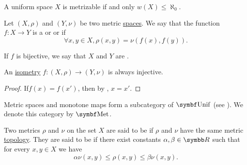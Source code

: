 \begin{theorem}\label{thm:countable_uniform_base_implies_metrizable}\cite[theorem 8.1.21]{Engelking1989}
  A uniform space \( X \) is metrizable if and only \( w(X) \leq \aleph_0 \).
\end{theorem}

\begin{definition}\label{def:isometry}\cite[253]{Engelking1989}
  Let \( (X, \rho) \) and \( (Y, \nu) \) be two metric \hyperref[def:metric_space]{spaces}. We say that the function \( f: X \to Y \) is a  or  or  if
  \begin{equation*}
    \forall x, y \in X, \rho(x, y) = \nu(f(x), f(y)).
  \end{equation*}

  If \( f \) is bijective, we say that \( X \) and \( Y \) are .
\end{definition}

\begin{proposition}\label{def:isometry_is_injective}
  An \hyperref[def:isometry]{isometry} \( f: (X, \rho) \to (Y, \nu) \) is always injective.
\end{proposition}
\begin{proof}
  If\LEM \( f(x) = f(x') \), then by , \( x = x' \).
\end{proof}

\begin{definition}\label{def:category_of_metric_spaces}
  Metric spaces and monotone maps form a subcategory of \( \Cat{Unif} \) (see ). We denote this category by \( \Cat{Met} \).
\end{definition}

\begin{definition}\label{def:equivalent_metrics}
  Two metrics \( \rho \) and \( \nu \) on the set \( X \) are said to be  if \( \rho \) and \( \nu \) have the same metric \hyperref[def:metric_topology]{topology}. They are said to be  if there exist constants \( \alpha, \beta \in \BR \) such that for every \( x, y \in X \) we have
  \begin{equation*}
    \alpha \nu(x, y) \leq \rho(x, y) \leq \beta \nu(x, y).
  \end{equation*}
\end{definition}

